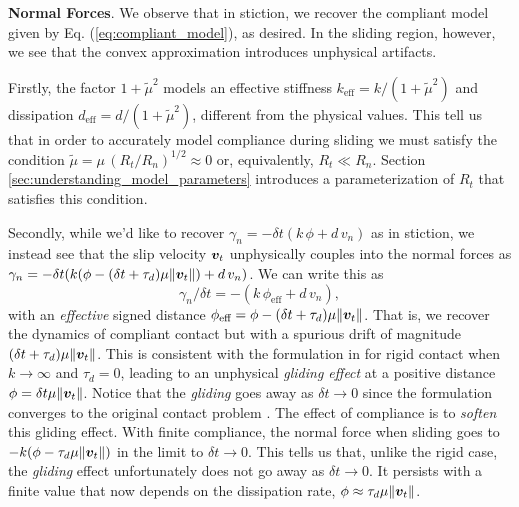 \textbf{Normal Forces}. We observe that in stiction, we recover the compliant
model given by Eq. (\ref{eq:compliant_model}), as desired. In the sliding
region, however, we see that the convex approximation introduces unphysical
artifacts. 

Firstly, the factor $1+\tilde{\mu}^2$ models an effective stiffness
$k_\text{eff}=k/(1+\tilde{\mu}^2)$ and dissipation
$d_\text{eff}=d/(1+\tilde{\mu}^2)$, different from the physical values. This
tell us that in order to accurately model compliance during sliding we must
satisfy the condition $\tilde\mu=\mu\,(R_t/R_n)^{1/2} \approx 0$ or,
equivalently, $R_t \ll R_n$. Section \ref{sec:understanding_model_parameters}
introduces a parameterization of $R_t$ that satisfies this condition.

Secondly, while we'd like to recover $\gamma_n = -\delta t(k\,\phi + d\,v_n)$ as
in stiction, we instead see that the slip velocity ${\bm{v}}_t$ unphysically
couples into the normal forces as $\gamma_n=-\delta t(k(\phi-(\delta
t+\tau_d)\mu\Vert{\bm{v}}_t\Vert) + d\,v_n)$. We can write this as
\begin{equation*}
  \gamma_n/\delta t=-(k\,\phi_\text{eff} + d\,v_n),
\end{equation*}
with an \textit{effective} signed distance $\phi_\text{eff} = \phi-(\delta
t+\tau_d)\mu\Vert{\bm{v}}_t\Vert$. That is, we recover the dynamics of compliant
contact but with a spurious drift of magnitude $(\delta
t+\tau_d)\mu\Vert{\bm{v}}_t\Vert$. This is consistent with the formulation in
\cite{bib:anitescu2010} for rigid contact when $k\rightarrow \infty$ and
$\tau_d=0$, leading to an unphysical \textit{gliding effect} at a positive
distance $\phi=\delta t\mu\Vert{\bm{v}}_t\Vert$. Notice that the \textit{gliding}
goes away as $\delta t\rightarrow 0$ since the formulation converges to the
original contact problem \cite{bib:anitescu2006}. The effect of compliance is to
\textit{soften} this gliding effect. With finite compliance,  the normal force
when sliding goes to $-k(\phi-\tau_d\mu\Vert{\bm{v}}_t\Vert)$ in the limit to
$\delta t\rightarrow 0$. This tells us that, unlike the rigid case, the
\textit{gliding} effect unfortunately does not go away as $\delta t\rightarrow
0$. It persists with a finite value that now depends on the dissipation rate,
$\phi\approx\tau_d\mu\Vert{\bm{v}}_t\Vert$.

